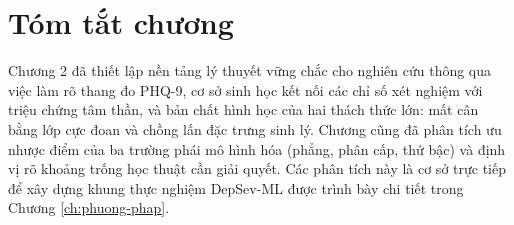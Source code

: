 \section{Tóm tắt chương}
\label{sec:tom-tat-chuong-2}

Chương 2 đã thiết lập nền tảng lý thuyết vững chắc cho nghiên cứu thông qua việc làm rõ thang đo PHQ-9, cơ sở sinh học kết nối các chỉ số xét nghiệm với triệu chứng tâm thần, và bản chất hình học của hai thách thức lớn: mất cân bằng lớp cực đoan và chồng lấn đặc trưng sinh lý. Chương cũng đã phân tích ưu nhược điểm của ba trường phái mô hình hóa (phẳng, phân cấp, thứ bậc) và định vị rõ khoảng trống học thuật cần giải quyết. Các phân tích này là cơ sở trực tiếp để xây dựng khung thực nghiệm DepSev-ML được trình bày chi tiết trong Chương \ref{ch:phuong-phap}.
